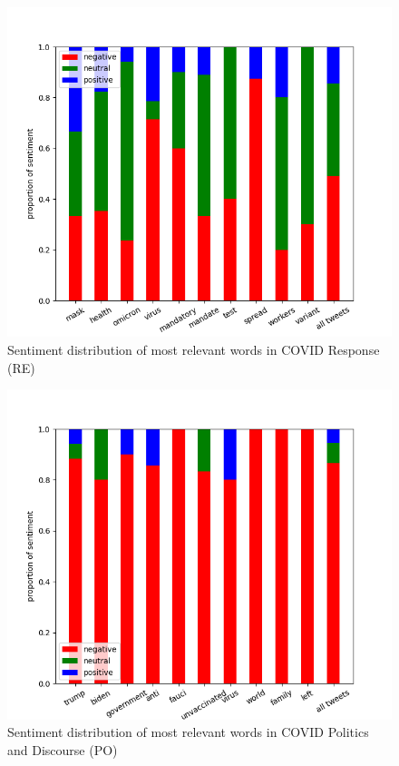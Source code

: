 \documentclass[letterpaper]{article} %
\begin{document}
\begin{figure}[H]
    \centering
    \includegraphics[scale=0.45]{RE_word_sentiment.png}
    \caption{Sentiment distribution of most relevant words in COVID Response (RE)}
    \label{fig:re-dist}
\end{figure}
\begin{figure}[H]
    \centering
    \includegraphics[scale=0.45]{PO_word_sentiment.png}
    \caption{Sentiment distribution of most relevant words in COVID Politics and Discourse (PO)}
    \label{fig:po-dist}
\end{figure}
\end{document}
